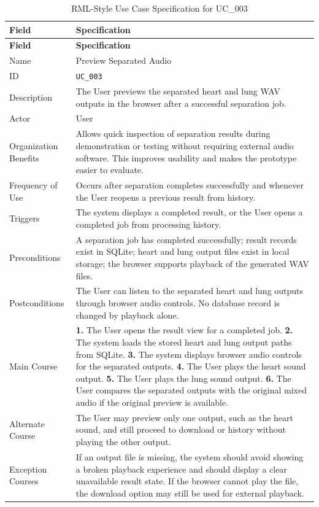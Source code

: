 \clearpage
\begin{longtable}{@{}p{} p{}@{}}
  \caption{RML-Style Use Case Specification for UC\_003}
  \label{tab:uc003-preview-separated-audio} \\
  \toprule
  \textbf{Field} & \textbf{Specification} \\
  \midrule
  \endfirsthead
  \toprule
  \textbf{Field} & \textbf{Specification} \\
  \midrule
  \endhead
  \bottomrule
  \endfoot
  Name & Preview Separated Audio \\
  ID & \texttt{UC\_003} \\
  Description & The User previews the separated heart and lung WAV outputs in the browser after a successful separation job. \\
  Actor & User \\
  Organization Benefits & Allows quick inspection of separation results during demonstration or testing without requiring external audio software. This improves usability and makes the prototype easier to evaluate. \\
  Frequency of Use & Occurs after separation completes successfully and whenever the User reopens a previous result from history. \\
  Triggers & The system displays a completed result, or the User opens a completed job from processing history. \\
  Preconditions & A separation job has completed successfully; result records exist in SQLite; heart and lung output files exist in local storage; the browser supports playback of the generated WAV files. \\
  Postconditions & The User can listen to the separated heart and lung outputs through browser audio controls. No database record is changed by playback alone. \\
  Main Course & \textbf{1.} The User opens the result view for a completed job. \newline
  \textbf{2.} The system loads the stored heart and lung output paths from SQLite. \newline
  \textbf{3.} The system displays browser audio controls for the separated outputs. \newline
  \textbf{4.} The User plays the heart sound output. \newline
  \textbf{5.} The User plays the lung sound output. \newline
  \textbf{6.} The User compares the separated outputs with the original mixed audio if the original preview is available. \\
  Alternate Course & The User may preview only one output, such as the heart sound, and still proceed to download or history without playing the other output. \\
  Exception Courses & If an output file is missing, the system should avoid showing a broken playback experience and should display a clear unavailable result state. If the browser cannot play the file, the download option may still be used for external playback. \\
\end{longtable}

